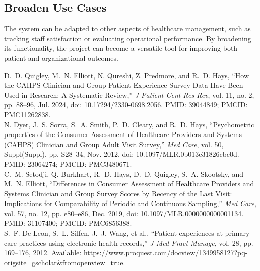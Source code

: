 \subsection{Broaden Use Cases}
The system can be adapted to other aspects of healthcare management, such as tracking staff satisfaction or evaluating operational performance. By broadening its functionality, the project can become a versatile tool for improving both patient and organizational outcomes.


\begin{thebibliography}{1}

D.~D. Quigley, M.~N. Elliott, N. Qureshi, Z. Predmore, and R.~D. Hays, 
``How the CAHPS Clinician and Group Patient Experience Survey Data Have Been Used in Research: A Systematic Review,'' 
\textit{J Patient Cent Res Rev}, vol. 11, no. 2, pp. 88--96, Jul. 2024, doi: 10.17294/2330-0698.2056. PMID: 39044849; PMCID: PMC11262838.\\

N. Dyer, J.~S. Sorra, S.~A. Smith, P.~D. Cleary, and R.~D. Hays,
``Psychometric properties of the Consumer Assessment of Healthcare Providers and Systems (CAHPS\textsuperscript{\textregistered}) Clinician and Group Adult Visit Survey,'' 
\textit{Med Care}, vol. 50, Suppl(Suppl), pp. S28--34, Nov. 2012, doi: 10.1097/MLR.0b013e31826cbc0d. PMID: 23064274; PMCID: PMC3480671.\\

C.~M. Setodji, Q. Burkhart, R.~D. Hays, D.~D. Quigley, S.~A. Skootsky, and M.~N. Elliott,
``Differences in Consumer Assessment of Healthcare Providers and Systems Clinician and Group Survey Scores by Recency of the Last Visit: Implications for Comparability of Periodic and Continuous Sampling,'' 
\textit{Med Care}, vol. 57, no. 12, pp. e80--e86, Dec. 2019, doi: 10.1097/MLR.0000000000001134. PMID: 31107400; PMCID: PMC6856388.\\

S.~F. De Leon, S.~L. Silfen, J.~J. Wang, et al., 
``Patient experiences at primary care practices using electronic health records,'' 
\textit{J Med Pract Manage}, vol. 28, pp. 169--176, 2012. Available: 
\url{https://www.proquest.com/docview/1349958127?pq-origsite=gscholar\&fromopenview=true}.
\end{thebibliography}









